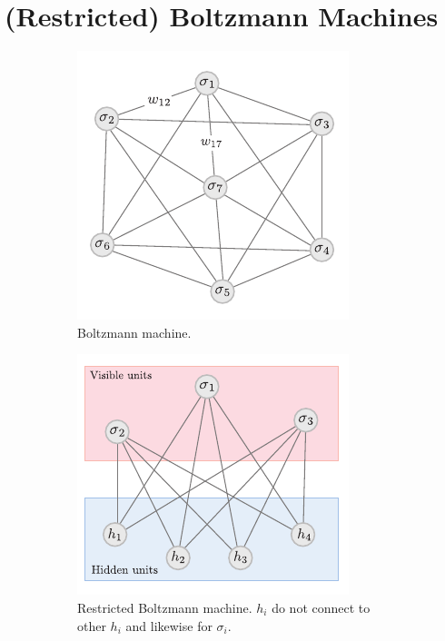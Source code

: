 \documentclass{article}
\begin{document}
\section{(Restricted) Boltzmann Machines}
\begin{figure}[t]
	\centering
	\begin{subfigure}[b]{0.45\textwidth}
		\centering
		\includegraphics[width=\textwidth]{fig/boltzmann.pdf}
		\caption{Boltzmann machine.}
		\label{fig:boltzmann}
	\end{subfigure}
	\begin{subfigure}[b]{0.45\textwidth}
		\centering
		\includegraphics[width=\textwidth]{fig/restricted-boltzmann.pdf}
		\caption{Restricted Boltzmann machine. $ h_i $ do not connect to other 
		$ h_i $ and likewise for $ \sigma_i $.}
		\label{fig:restricted-boltzmann}
	\end{subfigure}
	\caption{}
\end{figure}
\end{document}
